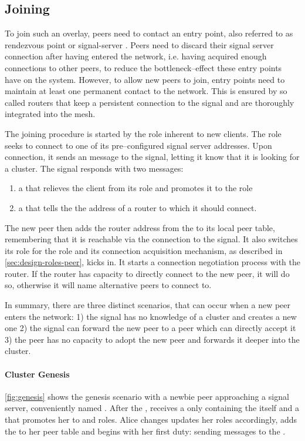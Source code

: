 \subsection{Joining}
To join such an overlay, peers need to contact an entry point, also referred to as rendezvous point or \gls{signal-server} \cite[p.384]{tanenbaum_wetherall_2011}.
Peers need to discard their signal server connection after having entered the network, i.e. having acquired enough connections to other peers, to reduce the bottleneck–effect these entry points have on the system.
However, to allow new peers to join, entry points need to maintain at least one permanent contact to the network. This is ensured by so called \glspl{router} that keep a persistent connection to the signal and are thoroughly integrated into the mesh.

The joining procedure is started by the \newbieRole role inherent to new clients. The \newbieRole role seeks to connect to one of its pre–configured signal server addresses.
Upon connection, it sends an \introduction message to the signal, letting it know that it is looking for a cluster. The signal responds with two messages:
\begin{enumerate}
    \item a \roleUpdate that relieves the client from its \newbieRole role and promotes it to the \peerRole role
    \item a \peerUpdate that tells the \newbieRole the address of a \gls{router} to which it should connect.
\end{enumerate}
The new peer then adds the router address from the \peerUpdate to its local peer table, remembering that it is reachable via the connection to the signal.
It also switches its \newbieRole role for the \peerRole role and its connection acquisition mechanism, as described in \vref{sec:design-roles-peer}, kicks in. It starts a connection negotiation process with the router. If the router has capacity to directly connect to the new peer, it will do so, otherwise it will name alternative peers to connect to.

In summary, there are three distinct scenarios, that can occur when a new peer enters the network: 1) the signal has no knowledge of a cluster and creates a new one 2) the signal can forward the new peer to a \routerRole peer which can directly accept it 3) the \routerRole peer has no capacity to adopt the new peer and forwards it deeper into the cluster.

\paragraph{Cluster Genesis}
\vref{fig:genesis} shows the genesis scenario with a newbie peer \alice approaching a signal server, conveniently named \signal. After the \introduction, \alice receives a \peerUpdate only containing the \signal itself and a \roleUpdate that promotes her to \peerRole and \routerRole roles. Alice changes updates her roles accordingly, adds the \signal to her peer table and begins with her first \routerRole duty: sending \routerAlive messages to the \signal.

